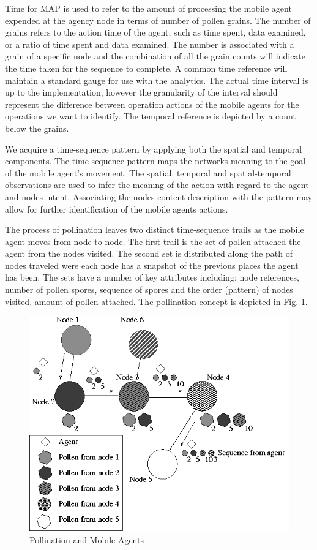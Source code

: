 \documentclass{acm_proc_article-sp}
\begin{document}
Time for MAP is used to refer to the amount of processing the mobile agent expended at the agency node in terms of number of pollen grains. The number of grains refers to the action time of the agent, such as time spent, data examined, or a ratio of time spent and data examined.  The number is associated with a grain of a specific node and the combination of all the grain counts will indicate the time taken for the sequence to complete. A common time reference will maintain a standard gauge for use with the analytics. The actual time interval is up to the implementation, however the granularity of the interval should represent the difference between operation actions of the mobile agents for the operations we want to identify.  The temporal reference is depicted by a count below the grains.

We acquire a time-sequence pattern by applying both the spatial and temporal components.  The time-sequence pattern maps the networks meaning to the goal of the mobile agent’s movement.  The spatial, temporal and spatial-temporal observations are used to infer the meaning of the action with regard to the agent and nodes intent. Associating the nodes content description with the pattern may allow for further identification of the mobile agents actions.  

The process of pollination leaves two distinct time-sequence trails as the mobile agent moves from node to node. The first trail is the set of pollen attached the agent from the nodes visited. The second set is distributed along the path of nodes traveled were each node has a snapshot of the previous places the agent has been. The sets have a number of key attributes including: node references, number of pollen spores, sequence of spores and the order (pattern) of nodes visited, amount of pollen attached. The pollination concept is depicted in Fig. 1.

\begin{figure}
\centering
\includegraphics[scale=0.45]{AgentPollen-Example}
\caption{Pollination and Mobile Agents}
\end{figure}
\end{document}
